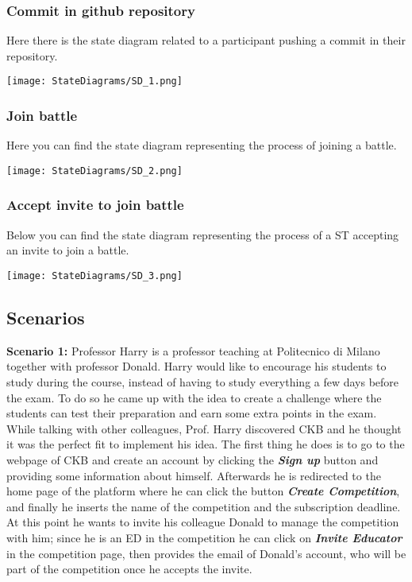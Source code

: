 \subsubsection*{Commit in github repository}
Here there is the state diagram related to a participant pushing a commit in their repository.
  \begin{center}
    \texttt{[image: StateDiagrams/SD\_1.png]}
  \end{center}
\newpage 
\subsubsection*{Join battle}
Here you can find the state diagram representing the process of joining a battle.
  \begin{center}
    \texttt{[image: StateDiagrams/SD\_2.png]}
  \end{center}

\subsubsection*{Accept invite to join battle}
Below you can find the state diagram representing the process of a ST accepting an invite to join a battle.
  \begin{center}
    \texttt{[image: StateDiagrams/SD\_3.png]}
  \end{center}

  
\subsection{Scenarios}
\label{ss:scenarios}%
\textbf{Scenario 1:} Professor Harry is a professor teaching at Politecnico di Milano together with professor Donald. Harry would like to encourage his students to study during the course, instead of having to study everything a few days before the exam. To do so he came up with the idea to create a challenge where the students can test their preparation and earn some extra points in the exam. While talking with other colleagues, Prof. Harry discovered CKB and he thought it was the perfect fit to implement his idea. The first thing he does is to go to the webpage of CKB and create an account by clicking the \textbf{\textit{Sign up}} button and providing some information about himself. Afterwards he is redirected to the home page of the platform where he can click the button \textbf{\textit{Create Competition}}, and finally he inserts the name of the competition and the subscription deadline. At this point he wants to invite his colleague Donald to manage the competition with him; since he is an ED in the competition he can click on \textbf{\textit{Invite Educator}} in the competition page, then provides the email of Donald's account, who will be part of the competition once he accepts the invite.



